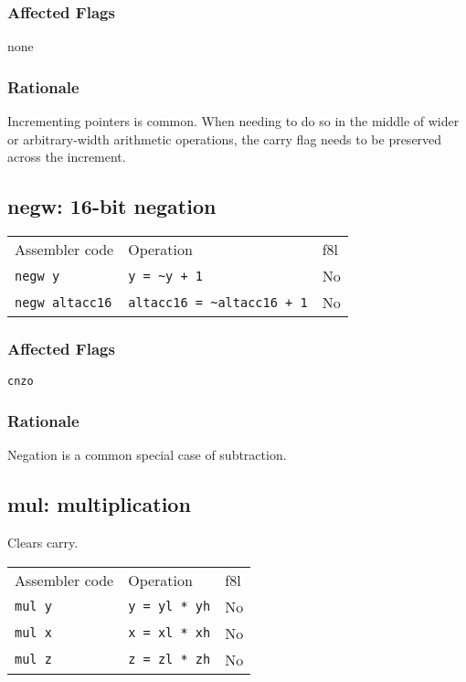 \documentclass{book}
\begin{document}
\subsubsection*{Affected Flags}

none

\subsubsection*{Rationale}

Incrementing pointers is common. When needing to do so in the middle of wider or arbitrary-width arithmetic operations, the carry flag needs to be preserved across the increment.


\subsection{negw: 16-bit negation}

\begin{tabular}{l l l}
Assembler code         & Operation                            & f8l \\
\texttt{negw y}        & \texttt{y = \~{}y + 1}               & No \\
\texttt{negw altacc16} & \texttt{altacc16 = \~{}altacc16 + 1} & No \\
\end{tabular}

\subsubsection*{Affected Flags}

\texttt{cnzo}

\subsubsection*{Rationale}

Negation is a common special case of subtraction.


\subsection{mul: multiplication}

Clears carry.

\begin{tabular}{l l l}
Assembler code & Operation            & f8l \\
\texttt{mul y} & \texttt{y = yl * yh} & No \\
\texttt{mul x} & \texttt{x = xl * xh} & No \\
\texttt{mul z} & \texttt{z = zl * zh} & No \\
\end{tabular}
\end{document}

